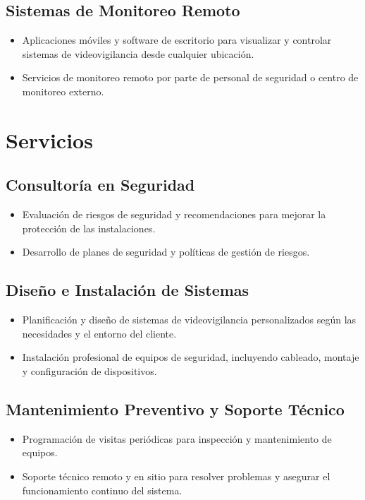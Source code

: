 \documentclass{report}
\begin{document}
          \subsection{Sistemas de Monitoreo Remoto}
            \begin{itemize}
              \item Aplicaciones móviles y software de escritorio para visualizar y controlar sistemas de videovigilancia desde cualquier ubicación.
              \item Servicios de monitoreo remoto por parte de personal de seguridad o centro de monitoreo externo.
            \end{itemize}
        \clearpage\section{Servicios}
          \subsection{Consultoría en Seguridad}
            \begin{itemize}
              \item Evaluación de riesgos de seguridad y recomendaciones para mejorar la protección de las instalaciones.
              \item Desarrollo de planes de seguridad y políticas de gestión de riesgos.
            \end{itemize}
          \subsection{Diseño e Instalación de Sistemas}
            \begin{itemize}
              \item Planificación y diseño de sistemas de videovigilancia personalizados según las necesidades y el entorno del cliente.
              \item Instalación profesional de equipos de seguridad, incluyendo cableado, montaje y configuración de dispositivos.
            \end{itemize}
          \subsection{Mantenimiento Preventivo y Soporte Técnico}
            \begin{itemize}
              \item Programación de visitas periódicas para inspección y mantenimiento de equipos.
              \item Soporte técnico remoto y en sitio para resolver problemas y asegurar el funcionamiento continuo del sistema.
            \end{itemize}
\end{document}
